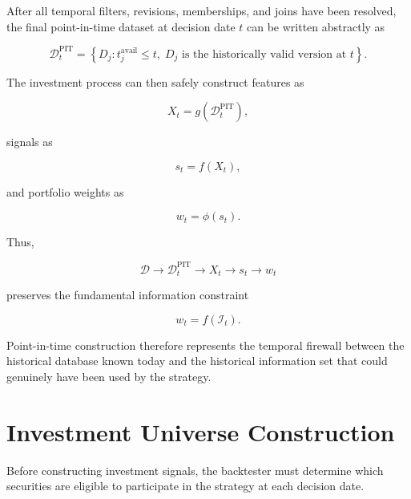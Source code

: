 \documentclass[11pt,a4paper]{article}
\begin{document}
After all temporal filters, revisions, memberships, and joins have been
resolved, the final point-in-time dataset at decision date $t$ can be written
abstractly as

\begin{equation}
\boxed{
\mathcal{D}_t^{\mathrm{PIT}}
=
\left\{
D_j:
t_j^{\mathrm{avail}}
\leq
t,
\;
D_j
\text{ is the historically valid version at }t
\right\}.
}
\end{equation}

The investment process can then safely construct features as

\begin{equation}
X_t
=
g
\left(
\mathcal{D}_t^{\mathrm{PIT}}
\right),
\end{equation}

signals as

\begin{equation}
s_t
=
f(X_t),
\end{equation}

and portfolio weights as

\begin{equation}
w_t
=
\phi(s_t).
\end{equation}

Thus,

\begin{equation}
\boxed{
\mathcal{D}
\rightarrow
\mathcal{D}_t^{\mathrm{PIT}}
\rightarrow
X_t
\rightarrow
s_t
\rightarrow
w_t
}
\end{equation}

preserves the fundamental information constraint

\begin{equation}
\boxed{
w_t=f(\mathcal{I}_t).
}
\end{equation}

Point-in-time construction therefore represents the temporal firewall between
the historical database known today and the historical information set that
could genuinely have been used by the strategy.

\section{Investment Universe Construction}
\label{sec:investment_universe}

Before constructing investment signals, the backtester must determine which
securities are eligible to participate in the strategy at each decision date.
\end{document}
